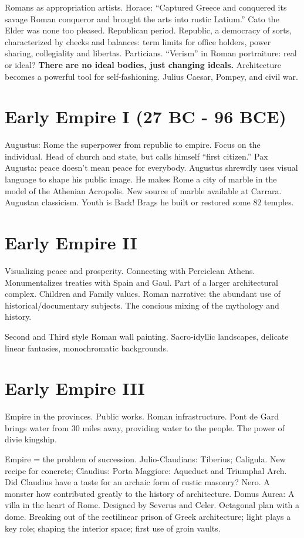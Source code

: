 \documentclass[10pt]{armath}
\begin{document}
Romans as appropriation artists. Horace: ``Captured Greece and conquered its
savage Roman conqueror and brought the arts into rustic Latium.'' Cato the Elder
was none too pleased. Republican period. Republic, a democracy of sorts,
characterized by checks and balances: term limits for office holders, power
sharing, collegiality and libertas. Particians. ``Verism'' in Roman
portraiture: real or ideal? \textbf{There are no ideal bodies, just changing
ideals.} Architecture becomes a powerful tool for self-fashioning. Julius
Caesar, Pompey, and civil war.

\section{Early Empire I (27 BC - 96 BCE)}%
\label{sec:early_empire_i}

Augustus: Rome the superpower from republic to empire. Focus on the individual.
Head of church and state, but calls himself ``first citizen.'' Pax Augusta:
peace doesn't mean peace for everybody. Augustus shrewdly uses visual language
to shape his public image. He makes Rome a city of marble in the model of the
Athenian Acropolis. New source of marble available at Carrara. Augustan
classicism. Youth is Back! Brags he built or restored some 82 temples.

\section{Early Empire II}%
\label{sec:early_empire II}

Visualizing peace and prosperity. Connecting with Pereiclean Athens.
Monumentalizes treaties with Spain and Gaul. Part of a larger architectural
complex. Children and Family values. Roman narrative: the abundant use of
historical/documentary subjects. The concious mixing of the mythology and
history.

Second and Third style Roman wall painting. Sacro-idyllic landscapes, delicate
linear fantasies, monochromatic backgrounds.

\section{Early Empire III}%
\label{sec:early_empire_iii}

Empire in the provinces. Public works. Roman infrastructure. Pont de Gard
brings water from 30 miles away, providing water to the people. The power of
divie kingship.

Empire = the problem of succession. Julio-Claudians: Tiberius; Caligula. New
recipe for concrete; Claudius: Porta Maggiore: Aqueduct and Triumphal Arch. Did
Claudius have a taste for an archaic form of rustic masonry?
Nero. A monster how contributed greatly to the history of architecture. Domus
Aurea: A villa in the heart of Rome. Designed by Severus and Celer. Octagonal
plan with a dome. Breaking out of the rectilinear prison of Greek architecture;
light plays a key role; shaping the interior space; first use of groin vaults.
\end{document}

